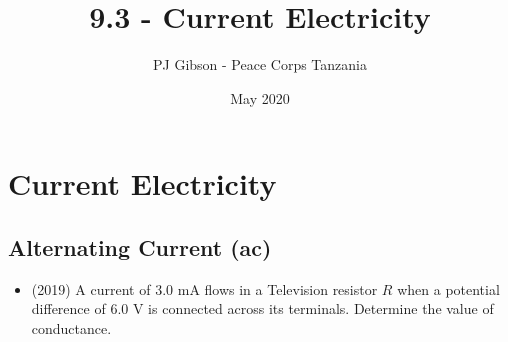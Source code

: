 \documentclass{article}
\title{9.3 - Current Electricity}
\author{PJ Gibson - Peace Corps Tanzania}
\date{May 2020}
\begin{document}
\maketitle


\section{Current Electricity}

\subsection{Alternating Current (ac)}
\begin{itemize}
\item (2019)  A current of $ 3.0$ mA flows in a Television resistor $ R$ when a potential difference of $ 6.0$ V is connected across its terminals. Determine the value of conductance.
\end{itemize}
\end{document}
